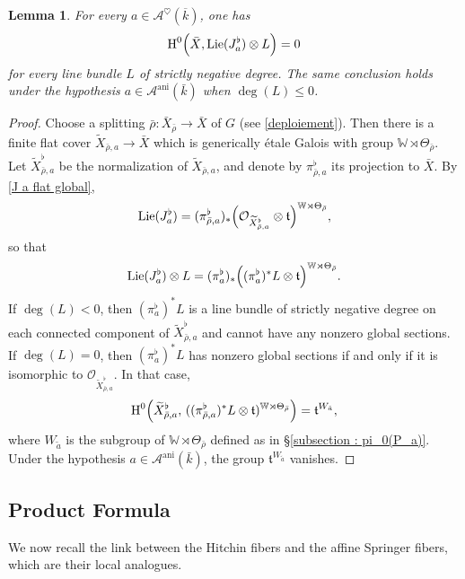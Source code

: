 \documentclass[12pt,english]{smfart}
\numberwithin{equation}{subsection}
\newtheorem{lemma}[equation]{Lemma}
\theoremstyle{remark}
\begin{document}
\begin{lemma}\label{annulation J a flat}
For every $a\in\mathcal{A}^\heartsuit(\overline{k})$, one has
$$
\operatorname{H}^0\Bigl(\bar{X},\operatorname{Lie}(J_a^\flat)\otimes L\Bigr)=0
$$
for every line bundle $L$ of strictly negative degree.
The same conclusion holds under the hypothesis $a\in\mathcal{A}^\mathrm{ani}(\bar{k})$ when $\deg(L)\leq 0$.
\end{lemma}

\begin{proof}
Choose a splitting $\bar\rho:\bar{X}_{\bar\rho}\rightarrow \bar X$ of $G$ (see \ref{deploiement}).
Then there is a finite flat cover $\widetilde{X}_{\bar\rho,a}\rightarrow\bar X$ which is generically \'etale Galois with group
$\mathbb{W}\rtimes \Theta_{\bar\rho}$. Let $\widetilde{X}_{\bar\rho,a}^\flat$ be the normalization of $\widetilde{X}_{\bar\rho,a}$,
and denote by $\pi_{\bar\rho,a}^\flat$ its projection to $\bar X$. By \ref{J a flat global},
$$
\operatorname{Lie}(J_a^\flat)=(\pi_{\bar\rho,a}^\flat)_*\Bigl(\mathcal{O}_{\widetilde{X}_{\bar\rho,a}^\flat}\otimes \mathfrak{t}\Bigr)^{\mathbb{W}\rtimes \Theta_{\bar\rho}},
$$
so that
$$
\operatorname{Lie}(J_a^\flat)\otimes L=(\pi_a^\flat)_*\Bigl((\pi_a^\flat)^*L\otimes \mathfrak{t}\Bigr)^{\mathbb{W}\rtimes \Theta_{\bar\rho}}.
$$
If $\deg(L)<0$, then $(\pi_a^\flat)^*L$ is a line bundle of strictly negative degree on each connected component of $\widetilde{X}_{\bar\rho,a}^\flat$
and cannot have any nonzero global sections.
If $\deg(L)=0$, then $(\pi_a^\flat)^*L$ has nonzero global sections if and only if it is isomorphic to $\mathcal{O}_{\widetilde{X}_{\bar\rho,a}^\flat}$.
In that case,
$$
\operatorname{H}^0\Bigl(\widetilde{X}_{\bar\rho,a}^\flat,\,((\pi_{\bar\rho,a}^\flat)^*L\otimes \mathfrak{t})^{\mathbb{W}\rtimes \Theta_{\bar\rho}}\Bigr)=\mathfrak{t}^{W_{\tilde a}},
$$
where $W_{\tilde a}$ is the subgroup of $\mathbb{W}\rtimes \Theta_{\bar\rho}$ defined as in \S\ref{subsection : pi_0(P_a)}.
Under the hypothesis $a\in\mathcal{A}^\mathrm{ani}(\bar{k})$, the group $\mathfrak{t}^{W_{\tilde a}}$ vanishes.
\end{proof}

\subsection{Product Formula}

We now recall the link between the Hitchin fibers and the affine Springer fibers,
which are their local analogues.
\end{document}

